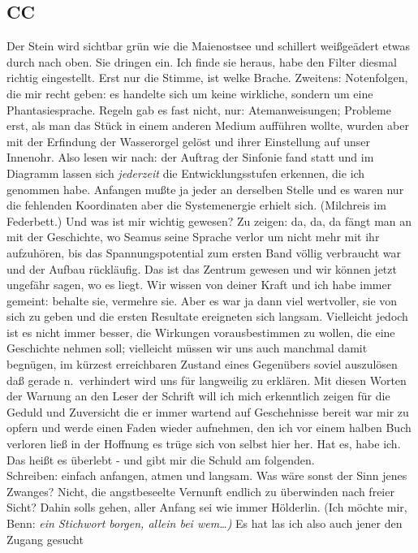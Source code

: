 \documentclass[
]{article}
\author{}
\date{\vspace{-2.5em}}
\begin{document}
\subsection{CC}\label{cc}

Der Stein wird sichtbar grün wie die Maienostsee und schillert
weißgeädert etwas durch nach oben. Sie dringen ein. Ich finde sie
heraus, habe den Filter diesmal richtig eingestellt. Erst nur die
Stimme, ist welke Brache. Zweitens: Notenfolgen, die mir recht geben: es
handelte sich um keine wirkliche, sondern um eine Phantasiesprache.
Regeln gab es fast nicht, nur: Atemanweisungen; Probleme erst, als man
das Stück in einem anderen Medium aufführen wollte, wurden aber mit der
Erfindung der Wasserorgel gelöst und ihrer Einstellung auf unser
Innenohr. Also lesen wir nach: der Auftrag der Sinfonie fand statt und
im Diagramm lassen sich \emph{jederzeit} die Entwicklungsstufen
erkennen, die ich genommen habe. Anfangen mußte ja jeder an derselben
Stelle und es waren nur die fehlenden Koordinaten aber die Systemenergie
erhielt sich. (Milchreis im Federbett.) Und was ist mir wichtig gewesen?
Zu zeigen: da, da, da fängt man an mit der Geschichte, wo Seamus seine
Sprache verlor um nicht mehr mit ihr aufzuhören, bis das
Spannungspotential zum ersten Band völlig verbraucht war und der Aufbau
rückläufig. Das ist das Zentrum gewesen und wir können jetzt ungefähr
sagen, wo es liegt. Wir wissen von deiner Kraft und ich habe immer
gemeint: behalte sie, vermehre sie. Aber es war ja dann viel wertvoller,
sie von sich zu geben und die ersten Resultate ereigneten sich langsam.
Vielleicht jedoch ist es nicht immer besser, die Wirkungen
vorausbestimmen zu wollen, die eine Geschichte nehmen soll; vielleicht
müssen wir uns auch manchmal damit begnügen, im kürzest erreichbaren
Zustand eines Gegenübers soviel auszulösen daß gerade n.~verhindert wird
uns für langweilig zu erklären. Mit diesen Worten der Warnung an den
Leser der Schrift will ich mich erkenntlich zeigen für die Geduld und
Zuversicht die er immer wartend auf Geschehnisse bereit war mir zu
opfern und werde einen Faden wieder aufnehmen, den ich vor einem halben
Buch verloren ließ in der Hoffnung es trüge sich von selbst hier her.
Hat es, habe ich. Das heißt es überlebt - und gibt mir die Schuld am
folgenden.\\
Schreiben: einfach anfangen, atmen und langsam. Was wäre sonst der Sinn
jenes Zwanges? Nicht, die angstbeseelte Vernunft endlich zu überwinden
nach freier Sicht? Dahin soll\textquotesingle s gehen, aller Anfang sei
wie immer Hölderlin. (Ich möchte mir, Benn: \emph{ein Stichwort borgen,
allein bei wem\ldots)} Es hat las ich also auch jener den Zugang gesucht
\end{document}
